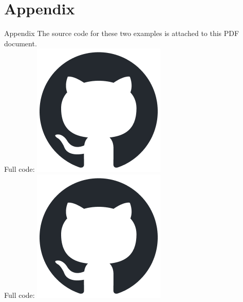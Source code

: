 \documentclass[graphics]{beamer}
\newcommand{\backupend}{
   \addtocounter{framenumberappendix}{-\value{framenumber}}
   \addtocounter{framenumber}{\value{framenumberappendix}} 
}
\begin{document}
\section{Appendix}
\begin{frame}{Appendix}
    The source code for these two examples is attached to this PDF document. \\
    Full code:  \href{https://github.com/rjzak/CMSC104/blob/master/L16_Functions3/the_box.c}{\includegraphics[scale=0.2]{Images/github-mark.png}}\\
    Full code:  \href{https://github.com/rjzak/CMSC104/blob/master/L16_Functions3/the_rectangle.c}{\includegraphics[scale=0.2]{Images/github-mark.png}}
\end{frame}

\backupend
\end{document}
